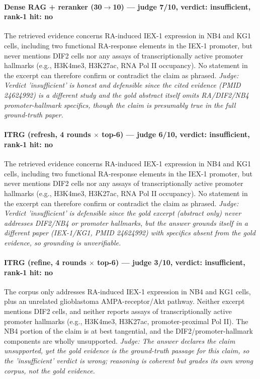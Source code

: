 \documentclass[sigconf, review, anonymous]{acmart}
\begin{document}
\paragraph{Dense RAG + reranker (30$\to$10) --- judge 7/10, verdict: insufficient, rank-1 hit: no}
\noindent The retrieved evidence concerns RA-induced IEX-1 expression in NB4 and KG1 cells, including two functional RA-response elements in the IEX-1 promoter, but never mentions DIF2 cells nor any assays of transcriptionally active promoter hallmarks (e.g., H3K4me3, H3K27ac, RNA Pol II occupancy). No statement in the excerpt can therefore confirm or contradict the claim as phrased.
\noindent\small\textit{Judge: Verdict 'insufficient' is honest and defensible since the cited evidence (PMID 24624992) is a different study and the gold abstract itself omits RA/DIF2/NB4 promoter-hallmark specifics, though the claim is presumably true in the full ground-truth paper.}
\paragraph{ITRG (refresh, 4 rounds $\times$ top-6) --- judge 6/10, verdict: insufficient, rank-1 hit: no}
\noindent The retrieved evidence concerns RA-induced IEX-1 expression in NB4 and KG1 cells, including two functional RA-response elements in the IEX-1 promoter, but never mentions DIF2 cells nor any assays of transcriptionally active promoter hallmarks (e.g., H3K4me3, H3K27ac, RNA Pol II occupancy). No statement in the excerpt can therefore confirm or contradict the claim as phrased.
\noindent\small\textit{Judge: Verdict 'insufficient' is defensible since the gold excerpt (abstract only) never addresses DIF2/NB4 or promoter hallmarks, but the answer grounds itself in a different paper (IEX-1/KG1, PMID 24624992) with specifics absent from the gold evidence, so grounding is unverifiable.}
\paragraph{ITRG (refine, 4 rounds $\times$ top-6) --- judge 3/10, verdict: insufficient, rank-1 hit: no}
\noindent The corpus only addresses RA-induced IEX-1 expression in NB4 and KG1 cells, plus an unrelated glioblastoma AMPA-receptor/Akt pathway. Neither excerpt mentions DIF2 cells, and neither reports assays of transcriptionally active promoter hallmarks (e.g., H3K4me3, H3K27ac, promoter-proximal Pol II). The NB4 portion of the claim is at best tangential, and the DIF2/promoter-hallmark components are wholly unsupported.
\noindent\small\textit{Judge: The answer declares the claim unsupported, yet the gold evidence is the ground-truth passage for this claim, so the 'insufficient' verdict is wrong; reasoning is coherent but grades its own wrong corpus, not the gold evidence.}
\end{document}
